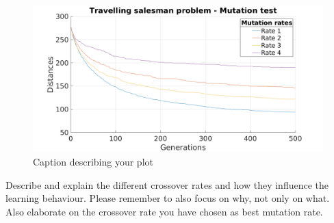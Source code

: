 \documentclass[a4paper, 12pt]{article}
\begin{document}
\begin{figure}[ht!]
  \centering
  \includegraphics[width=1.0\textwidth]{images/mutfig}
    \caption{Caption describing your plot \label{fig:mutfig}}
\end{figure}

Describe and explain the different crossover rates and how they influence the learning behaviour. Please remember to also focus on why, not only on what.
Also elaborate on the crossover rate you have chosen as best mutation rate.
\end{document}
